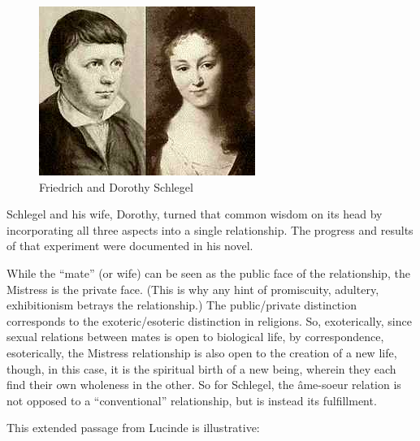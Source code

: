 \begin{figure}
\centering
 \includegraphics[scale=.5]{a20061012Lucinde-img001.jpg} 
 \caption{Friedrich and Dorothy Schlegel}
\end{figure}

Schlegel and his wife, Dorothy, turned that common wisdom on its head by incorporating all three aspects into a single relationship. The progress and results of that experiment were documented in his novel.

While the “mate” (or wife) can be seen as the public face of the relationship, the Mistress is the private face. (This is why any hint of promiscuity, adultery, exhibitionism betrays the relationship.) The public/private distinction corresponds to the exoteric/esoteric distinction in religions. So, exoterically, since sexual relations between mates is open to biological life, by correspondence, esoterically, the Mistress relationship is also open to the creation of a new life, though, in this case, it is the spiritual birth of a new being, wherein they each find their own wholeness in the other. So for Schlegel, the âme-soeur relation is not opposed to a “conventional” relationship, but is instead its fulfillment.

This extended passage from Lucinde is illustrative:

